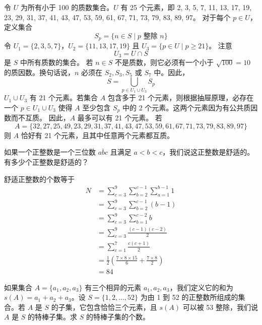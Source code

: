 \begin{questions}
\begin{solution}
令 $U$ 为所有小于 100 的质数集合。$U$ 有 25 个元素，即
2, 3, 5, 7, 11, 13, 17, 19, 23, 29, 31, 37, 41, 43, 47, 53, 59, 61, 67, 71, 73, 79, 83, 89, 97。
对于每个 $p \in U$，定义集合
\[ S_p = \{n \in S \mid p \text{ 整除 } n\}  \]
令 $U_1 = \{2, 3, 5, 7\}$，$U_2 = \{11, 13, 17, 19\}$ 且 $U_3 = \{p \in U \mid p \ge 21\}$。
注意
\[ U_3 = U \cap S  \]
是 $S$ 中所有质数的集合。
若 $n \in S$ 不是质数，则它必须有一个小于 $\sqrt{100} = 10$ 的质因数。换句话说，$n$ 必须在 $S_2, S_3, S_5$ 或 $S_7$ 中。因此，
\[ S = \bigcup_{p \in U_1 \cup U_3} S_p  \]
$U_1 \cup U_3$ 有 21 个元素。若集合 $A$ 包含多于 21 个元素，则根据抽屉原理，必存在一个 $p \in U_1 \cup U_3$ 使得 $A$ 至少包含 $S_p$ 中的 2 个元素。这两个元素因为有公共质因数而不互质。
因此，$A$ 最多可以有 21 个元素。
若
\[ A = \{32, 27, 25, 49, 23, 29, 31, 37, 41, 43, 47, 53, 59, 61, 67, 71, 73, 79, 83, 89, 97\}  \]
则 $A$ 恰好有 21 个元素，且其中任意两个元素都互质。
\end{solution}

\question 如果一个正整数是一个三位数 $\overline{abc}$ 且满足 $a < b < c$，我们说这正整数是舒适的。有多少个正整数是舒适的？

\begin{solution}
舒适正整数的个数等于
\begin{align}
N &= \sum_{c=3}^{9} \sum_{b=2}^{c-1} \sum_{a=1}^{b-1} 1 \\
&= \sum_{c=3}^{9} \sum_{b=2}^{c-1} (b - 1) \\
&= \sum_{c=3}^{9} \sum_{b=1}^{c-2} b \\
&= \sum_{c=3}^{9} \frac{(c - 1)(c - 2)}{2} \\
&= \sum_{c=1}^{7} \frac{c(c + 1)}{2} \\
&= \frac{1}{2} \left( \frac{7 \times 8 \times 15}{6} + \frac{7 \times 8}{2} \right) \\
&= 84
\end{align}
\end{solution}

\question 如果集合 $A = \{a_1, a_2, a_3\}$ 有三个相异的元素 $a_1, a_2, a_3$，我们定义它的和为 $s(A) = a_1 + a_2 + a_3$。设 $S = \{1, 2, \dots, 52\}$ 为由 1 到 52 的正整数所组成的集合。若 $A$ 是 $S$ 的子集，它包含恰恰三个元素，且 $s(A)$ 可以被 53 整除，我们说 $A$ 是 $S$ 的特棒子集。求 $S$ 的特棒子集的个数。


\end{questions}
